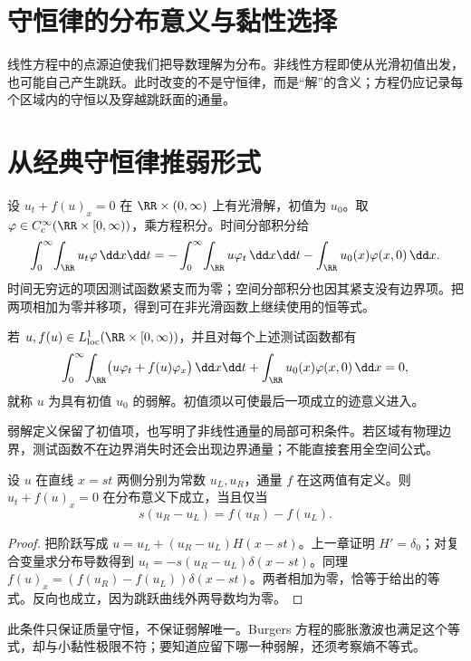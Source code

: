 \section{守恒律的分布意义与黏性选择}
线性方程中的点源迫使我们把导数理解为分布。非线性方程即使从光滑初值出发，也可能自己产生跳跃。此时改变的不是守恒律，而是“解”的含义；方程仍应记录每个区域内的守恒以及穿越跳跃面的通量。

\section{从经典守恒律推弱形式}

设 \(u_t+f(u)_x=0\) 在 \(\RR\times(0,\infty)\) 上有光滑解，初值为 \(u_0\)。取 \(\varphi\in C_c^\infty(\RR\times[0,\infty))\)，乘方程积分。时间分部积分给
\[
\int_0^\infty\!\int_{\RR}u_t\varphi\,\dd x\dd t
=-\int_0^\infty\!\int_{\RR}u\varphi_t\,\dd x\dd t
-\int_{\RR}u_0(x)\varphi(x,0)\,\dd x.
\]
时间无穷远的项因测试函数紧支而为零；空间分部积分也因其紧支没有边界项。把两项相加为零并移项，得到可在非光滑函数上继续使用的恒等式。

\begin{definition}[守恒律的弱解]
若 \(u,f(u)\in L^1_{\mathrm{loc}}(\RR\times[0,\infty))\)，并且对每个上述测试函数都有
\[
\int_0^\infty\!\int_{\RR}
\bigl(u\varphi_t+f(u)\varphi_x\bigr)\,\dd x\dd t
+\int_{\RR}u_0(x)\varphi(x,0)\,\dd x=0,
\]
就称 \(u\) 为具有初值 \(u_0\) 的弱解。初值须以可使最后一项成立的迹意义进入。
\end{definition}

弱解定义保留了初值项，也写明了非线性通量的局部可积条件。若区域有物理边界，测试函数不在边界消失时还会出现边界通量；不能直接套用全空间公式。

\begin{theorem}
设 \(u\) 在直线 \(x=st\) 两侧分别为常数 \(u_L,u_R\)，通量 \(f\) 在这两值有定义。则 \(u_t+f(u)_x=0\) 在分布意义下成立，当且仅当
\[
s(u_R-u_L)=f(u_R)-f(u_L).
\]
\end{theorem}
\begin{proof}
把阶跃写成 \(u=u_L+(u_R-u_L)H(x-st)\)。上一章证明 \(H'=\delta_0\)；对复合变量求分布导数得到 \(u_t=-s(u_R-u_L)\delta(x-st)\)。同理 \(f(u)_x=(f(u_R)-f(u_L))\delta(x-st)\)。两者相加为零，恰等于给出的等式。反向也成立，因为跳跃曲线外两导数均为零。
\end{proof}

此条件只保证质量守恒，不保证弱解唯一。Burgers 方程的膨胀激波也满足这个等式，却与小黏性极限不符；要知道应留下哪一种弱解，还须考察熵不等式。

